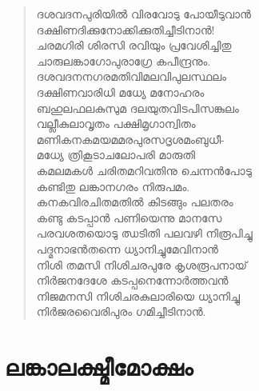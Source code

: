 \begin{verse}
ദശവദനപുരിയില്‍ വിരവോടു പോയീടുവാന്‍\\
ദക്ഷിണദിക്കുനോക്കിക്കുതിച്ചീടിനാന്‍!\\
ചരമഗിരി ശിരസി രവിയും പ്രവേശിച്ചിതു\\
ചാരുലങ്കാഗോപുരാഗ്രേ കപീന്ദ്രനും.\\
ദശവദനനഗരമതിവിമലവിപുലസ്ഥലം\\
ദക്ഷിണവാരിധി മധ്യേ മനോഹരം\\
ബഹുലഫലകുസുമ ദലയുതവിടപിസങ്കുലം\\
വല്ലീകുലാവൃതം പക്ഷിമൃഗാന്വിതം\\
മണികനകമയമമരപുരസദൃശമംബുധീ-\\
മധ്യേ ത്രികൂടാചലോപരി മാരുതി\\
കമലമകള്‍ ചരിതമറിവതിനു ചെന്നന്‍പോടു\\
കണ്ടിതു ലങ്കാനഗരം നിരുപമം.\\
കനകവിരചിതമതില്‍ കിടങ്ങും പലതരം\\
കണ്ടു കടപ്പാന്‍ പണിയെന്നു മാനസേ\\
പരവശതയൊടു ഝടിതി പലവഴി നിരൂപിച്ചു\\
പദ്മനാഭന്‍തന്നെ ധ്യാനിച്ചുമേവിനാന്‍\\
നിശി തമസി നിശിചരപുരേ കൃശരൂപനായ്\\
നിര്‍ജനദേശേ കടപ്പനെന്നോര്‍ത്തവന്‍\\
നിജമനസി നിശിചരകുലാരിയെ ധ്യാനിച്ചു\\
നിര്‍ജരവൈരിപുരം ഗമിച്ചീടിനാന്‍.
\end{verse}


\section{ലങ്കാലക്ഷ്മീമോക്ഷം}

